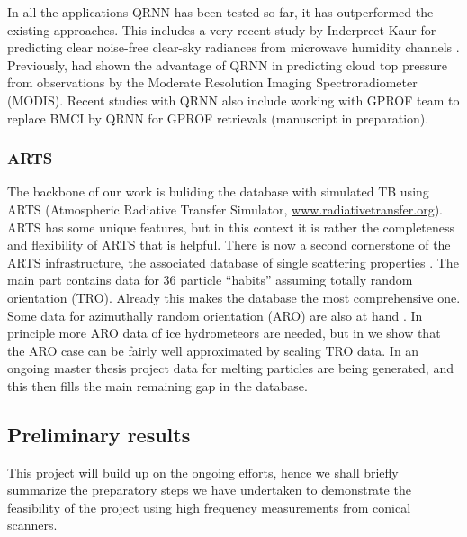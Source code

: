\documentclass[12pt,oneside,a4paper]{article}
\begin{document}

In all the applications QRNN has been tested so far, it has outperformed the existing approaches. This includes a very recent study by Inderpreet Kaur for predicting clear noise-free clear-sky radiances from microwave humidity channels \citep{kaur:2021:canma}. Previously, \citet{pfreundschuh:aneur:18} had shown the advantage of QRNN in predicting cloud top pressure from observations by the Moderate Resolution Imaging Spectroradiometer (MODIS). Recent studies with QRNN also include working with GPROF team  to replace BMCI by QRNN for GPROF retrievals (manuscript in preparation).


\subsubsection{ARTS}
\label{sec:arts}
% 
The backbone of our work is buliding the database with simulated TB using ARTS (Atmospheric Radiative Transfer Simulator, \url{www.radiativetransfer.org}). ARTS has some unique features, but in this context it is rather the completeness and flexibility of ARTS that is
helpful. There is now a second cornerstone of the ARTS infrastructure, the
associated database of single scattering properties \citep{eriksson:agene:18}.
The main part contains data for 36 particle ``habits'' assuming totally random
orientation (TRO). Already this makes the database the most comprehensive one.
Some data for azimuthally random orientation (ARO) are also at hand
\citep{brath:micro:20,ekelund:micro:20}. In principle more ARO data of ice
hydrometeors are needed, but in \citet{baralakas:intro:21} we show that the ARO
case can be fairly well approximated by scaling TRO data. In an ongoing master
thesis project data for melting particles are being generated, and this then
fills the main remaining gap in the database.

\subsection{Preliminary results}
%
This project will build up on the ongoing efforts, hence we shall briefly summarize the preparatory steps we have undertaken to demonstrate the feasibility of the project using high frequency measurements from conical scanners.
\end{document}
